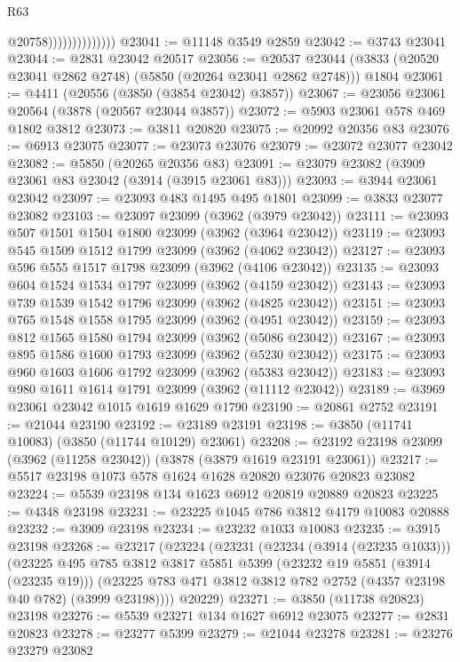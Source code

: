 \begin{lexlean}{R63}
\begin{coremodule}
                                @20758))))))))))))))
@23041 := @11148 @3549 @2859
@23042 := @3743 @23041
@23044 := @2831 @23042 @20517
@23056 := @20537
    @23044
    (@3833 (@20520 @23041 @2862 @2748) (@5850 (@20264 @23041 @2862 @2748)))
    @1804
@23061 := @4411 (@20556 (@3850 (@3854 @23042) @3857))
@23067 := @23056 @23061 @20564 (@3878 (@20567 @23044 @3857))
@23072 := @5903 @23061 @578 @469 @1802 @3812
@23073 := @3811 @20820
@23075 := @20992 @20356 @83
@23076 := @6913 @23075
@23077 := @23073 @23076
@23079 := @23072 @23077 @23042
@23082 := @5850 (@20265 @20356 @83)
@23091 := @23079 @23082 (@3909 @23061 @83 @23042 (@3914 (@3915 @23061 @83)))
@23093 := @3944 @23061 @23042
@23097 := @23093 @483 @1495 @495 @1801
@23099 := @3833 @23077 @23082
@23103 := @23097 @23099 (@3962 (@3979 @23042))
@23111 := @23093 @507 @1501 @1504 @1800 @23099 (@3962 (@3964 @23042))
@23119 := @23093 @545 @1509 @1512 @1799 @23099 (@3962 (@4062 @23042))
@23127 := @23093 @596 @555 @1517 @1798 @23099 (@3962 (@4106 @23042))
@23135 := @23093 @604 @1524 @1534 @1797 @23099 (@3962 (@4159 @23042))
@23143 := @23093 @739 @1539 @1542 @1796 @23099 (@3962 (@4825 @23042))
@23151 := @23093 @765 @1548 @1558 @1795 @23099 (@3962 (@4951 @23042))
@23159 := @23093 @812 @1565 @1580 @1794 @23099 (@3962 (@5086 @23042))
@23167 := @23093 @895 @1586 @1600 @1793 @23099 (@3962 (@5230 @23042))
@23175 := @23093 @960 @1603 @1606 @1792 @23099 (@3962 (@5383 @23042))
@23183 := @23093 @980 @1611 @1614 @1791 @23099 (@3962 (@11112 @23042))
@23189 := @3969 @23061 @23042 @1015 @1619 @1629 @1790
@23190 := @20861 @2752
@23191 := @21044 @23190
@23192 := @23189 @23191
@23198 := @3850 (@11741 @10083) (@3850 (@11744 @10129) @23061)
@23208 := @23192 @23198 @23099 (@3962 (@11258 @23042)) (@3878 (@3879 @1619 @23191 @23061))
@23217 := @5517 @23198 @1073 @578 @1624 @1628 @20820 @23076 @20823 @23082
@23224 := @5539 @23198 @134 @1623 @6912 @20819 @20889 @20823
@23225 := @4348 @23198
@23231 := @23225 @1045 @786 @3812 @4179 @10083 @20888
@23232 := @3909 @23198
@23234 := @23232 @1033 @10083
@23235 := @3915 @23198
@23268 := @23217
    (@23224
      (@23231
        (@23234 (@3914 (@23235 @1033)))
        (@23225
          @495
          @785
          @3812
          @3817
          @5851
          @5399
          (@23232 @19 @5851 (@3914 (@23235 @19)))
          (@23225 @783 @471 @3812 @3812 @782 @2752 (@4357 @23198 @40 @782) (@3999 @23198))))
      @20229)
@23271 := @3850 (@11738 @20823) @23198
@23276 := @5539 @23271 @134 @1627 @6912 @23075
@23277 := @2831 @20823
@23278 := @23277 @5399
@23279 := @21044 @23278
@23281 := @23276 @23279 @23082

\end{coremodule}
\end{lexlean}

